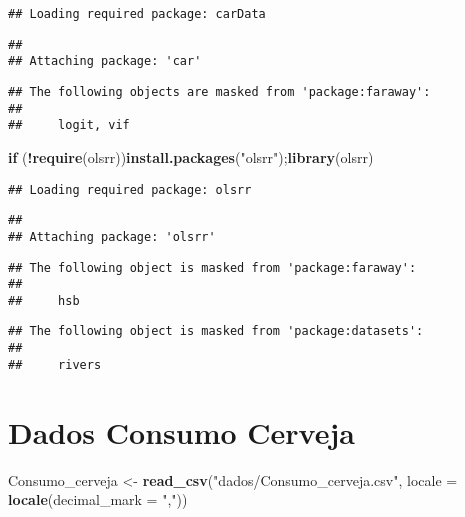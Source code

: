\documentclass[
]{article}
\newenvironment{Shaded}{\begin{snugshade}}{\end{snugshade}}
\newcommand{\AttributeTok}[1]{\textcolor[rgb]{0.13,0.29,0.53}{#1}}
\newcommand{\ControlFlowTok}[1]{\textcolor[rgb]{0.13,0.29,0.53}{\textbf{#1}}}
\newcommand{\FunctionTok}[1]{\textcolor[rgb]{0.13,0.29,0.53}{\textbf{#1}}}
\newcommand{\NormalTok}[1]{#1}
\newcommand{\OtherTok}[1]{\textcolor[rgb]{0.56,0.35,0.01}{#1}}
\newcommand{\SpecialCharTok}[1]{\textcolor[rgb]{0.81,0.36,0.00}{\textbf{#1}}}
\newcommand{\StringTok}[1]{\textcolor[rgb]{0.31,0.60,0.02}{#1}}
\begin{document}
\begin{verbatim}
## Loading required package: carData
\end{verbatim}

\begin{verbatim}
## 
## Attaching package: 'car'
\end{verbatim}

\begin{verbatim}
## The following objects are masked from 'package:faraway':
## 
##     logit, vif
\end{verbatim}

\begin{Shaded}
\begin{Highlighting}[]
\ControlFlowTok{if}\NormalTok{ (}\SpecialCharTok{!}\FunctionTok{require}\NormalTok{(}\StringTok{\textquotesingle{}olsrr\textquotesingle{}}\NormalTok{))}\FunctionTok{install.packages}\NormalTok{(}\StringTok{"olsrr"}\NormalTok{);}\FunctionTok{library}\NormalTok{(olsrr)}
\end{Highlighting}
\end{Shaded}

\begin{verbatim}
## Loading required package: olsrr
\end{verbatim}

\begin{verbatim}
## 
## Attaching package: 'olsrr'
\end{verbatim}

\begin{verbatim}
## The following object is masked from 'package:faraway':
## 
##     hsb
\end{verbatim}

\begin{verbatim}
## The following object is masked from 'package:datasets':
## 
##     rivers
\end{verbatim}

\hypertarget{dados-consumo-cerveja}{%
\section{Dados Consumo Cerveja}\label{dados-consumo-cerveja}}

\begin{Shaded}
\begin{Highlighting}[]
\NormalTok{Consumo\_cerveja }\OtherTok{\textless{}{-}} \FunctionTok{read\_csv}\NormalTok{(}\StringTok{"dados/Consumo\_cerveja.csv"}\NormalTok{,   }
                            \AttributeTok{locale =} \FunctionTok{locale}\NormalTok{(}\AttributeTok{decimal\_mark =} \StringTok{","}\NormalTok{))}
\end{Highlighting}
\end{Shaded}
\end{document}
